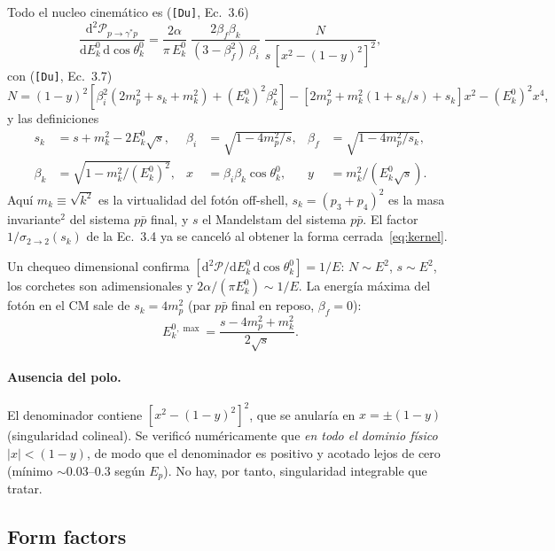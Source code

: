 \documentclass[11pt,a4paper]{article}
\newcommand{\Ekz}{E_k^0}
\newcommand{\cosz}{\cos\theta_k^0}
\newcommand{\gammastar}{\gamma^\ast}
\newcommand{\dd}{\mathrm{d}}
\newcommand{\Du}{\texttt{[Du]}}
\begin{document}
Todo el nucleo cinem\'atico es (\Du, Ec.~3.6)
\begin{equation}
\frac{\dd^2\mathcal{P}_{p\to\gammastar p}}{\dd\Ekz\,\dd\cosz}
= \frac{2\alpha}{\pi\,\Ekz}\;
\frac{2\beta_f\beta_k}{(3-\beta_f^2)\,\beta_i}\;
\frac{N}{s\,[x^2-(1-y)^2]^2},
\label{eq:kernel}
\end{equation}
con (\Du, Ec.~3.7)
\begin{equation}
N=(1-y)^2\!\left[\beta_i^2(2m_p^2+s_k+m_k^2)+(\Ekz)^2\beta_k^2\right]
-\left[2m_p^2+m_k^2(1+s_k/s)+s_k\right]x^2-(\Ekz)^2x^4,
\end{equation}
y las definiciones
\begin{equation}
\begin{aligned}
s_k&=s+m_k^2-2\Ekz\sqrt{s}, &
\beta_i&=\sqrt{1-4m_p^2/s}, &
\beta_f&=\sqrt{1-4m_p^2/s_k}, \\
\beta_k&=\sqrt{1-m_k^2/(\Ekz)^2}, &
x&=\beta_i\beta_k\cosz, &
y&=m_k^2/(\Ekz\sqrt{s}).
\end{aligned}
\end{equation}
Aqu\'i $m_k\equiv\sqrt{k^2}$ es la virtualidad del fot\'on off-shell,
$s_k=(p_3+p_4)^2$ es la masa invariante$^2$ del sistema $p\bar p$ final, y
$s$ el Mandelstam del sistema $p\bar p$. El factor $1/\sigma_{2\to2}(s_k)$ de
la Ec.~3.4 ya se cancel\'o al obtener la forma cerrada~\eqref{eq:kernel}.

Un chequeo dimensional confirma $[\dd^2\mathcal{P}/\dd\Ekz\,\dd\cosz]=1/E$:
$N\sim E^2$, $s\sim E^2$, los corchetes son adimensionales y
$2\alpha/(\pi\Ekz)\sim 1/E$. La energ\'ia m\'axima del fot\'on en el CM sale
de $s_k=4m_p^2$ (par $p\bar p$ final en reposo, $\beta_f=0$):
\begin{equation}
\Ekz{}^{,\max}=\frac{s-4m_p^2+m_k^2}{2\sqrt{s}} .
\end{equation}

\paragraph{Ausencia del polo.} El denominador contiene $[x^2-(1-y)^2]^2$, que
se anular\'ia en $x=\pm(1-y)$ (singularidad colineal). Se verific\'o
num\'ericamente que \emph{en todo el dominio f\'isico} $|x|<(1-y)$, de modo que
el denominador es positivo y acotado lejos de cero (m\'inimo $\sim0.03$--$0.3$
seg\'un $E_p$). No hay, por tanto, singularidad integrable que tratar.

\subsection{Form factors}
\end{document}
